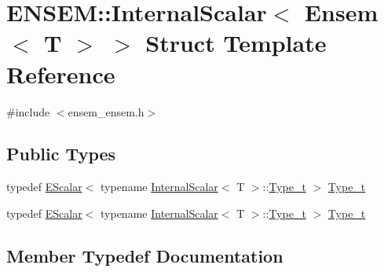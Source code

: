 \hypertarget{structENSEM_1_1InternalScalar_3_01Ensem_3_01T_01_4_01_4}{}\section{E\+N\+S\+EM\+:\+:Internal\+Scalar$<$ Ensem$<$ T $>$ $>$ Struct Template Reference}
\label{structENSEM_1_1InternalScalar_3_01Ensem_3_01T_01_4_01_4}


{\ttfamily \#include $<$ensem\+\_\+ensem.\+h$>$}

\subsection*{Public Types}
\begin{DoxyCompactItemize}
\item 
typedef \mbox{\hyperlink{classENSEM_1_1EScalar}{E\+Scalar}}$<$ typename \mbox{\hyperlink{structENSEM_1_1InternalScalar}{Internal\+Scalar}}$<$ T $>$\+::\mbox{\hyperlink{structENSEM_1_1InternalScalar_3_01Ensem_3_01T_01_4_01_4_ab389a1f835bfbbf4a47aefe1c076d832}{Type\+\_\+t}} $>$ \mbox{\hyperlink{structENSEM_1_1InternalScalar_3_01Ensem_3_01T_01_4_01_4_ab389a1f835bfbbf4a47aefe1c076d832}{Type\+\_\+t}}
\item 
typedef \mbox{\hyperlink{classENSEM_1_1EScalar}{E\+Scalar}}$<$ typename \mbox{\hyperlink{structENSEM_1_1InternalScalar}{Internal\+Scalar}}$<$ T $>$\+::\mbox{\hyperlink{structENSEM_1_1InternalScalar_3_01Ensem_3_01T_01_4_01_4_ab389a1f835bfbbf4a47aefe1c076d832}{Type\+\_\+t}} $>$ \mbox{\hyperlink{structENSEM_1_1InternalScalar_3_01Ensem_3_01T_01_4_01_4_ab389a1f835bfbbf4a47aefe1c076d832}{Type\+\_\+t}}
\end{DoxyCompactItemize}


\subsection{Member Typedef Documentation}
\mbox{\label{structENSEM_1_1InternalScalar_3_01Ensem_3_01T_01_4_01_4_ab389a1f835bfbbf4a47aefe1c076d832}} 

